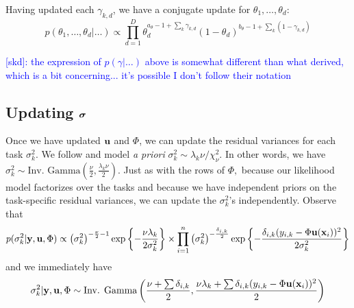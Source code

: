 \documentclass[12pt]{article}
\begin{document}
Having updated each $\gamma_{k,d}$, we have a conjugate update for $\theta_{1},\ldots, \theta_{d}$:
$$
p(\theta_{1}, \ldots, \theta_{d} | \ldots) \propto \prod_{d = 1}^{D}{\theta_{d}^{a_{\theta} - 1 + \sum_{k}{\gamma_{k,d}}}(1 - \theta_{d})^{b_{\theta} - 1 + \sum_{k}{(1 - \gamma_{k,d})}}}
$$


\textcolor{blue}{[skd]: the expression of $p(\gamma | \ldots)$ above is somewhat different than what \citet{Titsias2011} derived, which is a bit concerning... it's possible I don't follow their notation}

\subsection{Updating $\boldsymbol{\sigma}$}
Once we have updated $\mathbf{u}$ and $\Phi$, we can update the residual variances for each task $\sigma^{2}_{k}.$
We follow \citet{Chipman2010} and model \textit{a priori} $\sigma_{k}^{2} \sim \lambda_{k}\nu/\chi^{2}_{\nu}.$
In other words, we have $\sigma^{2}_{k} \sim \text{Inv. Gamma}\left(\frac{\nu}{2}, \frac{\lambda_{k}\nu}{2}\right).$
Just as with the rows of $\Phi,$ because our likelihood model factorizes over the tasks and because we have independent priors on the task-specific residual variances, we can update the $\sigma^{2}_{k}$'s independently.
Observe that
$$
p(\sigma^{2}_{k} | \mathbf{y}, \mathbf{u}, \Phi) \propto \left(\sigma^{2}_{k}\right)^{-\frac{\nu}{2} - 1}\exp\left\{-\frac{\nu\lambda_{k}}{2\sigma^{2}_{k}}\right\} \times \prod_{i = 1}^{n}{\left(\sigma_{k}^{2}\right)^{-\frac{\delta_{i,k}}{2}}\exp\left\{-\frac{\delta_{i,k}(y_{i,k} - \Phi\mathbf{u}(\mathbf{x}_{i}))^{2}}{2\sigma^{2}_{k}}\right\}}
$$
and we immediately have
$$
\sigma^{2}_{k} | \mathbf{y}, \mathbf{u}, \Phi \sim \text{Inv. Gamma}\left(\frac{\nu + \sum{\delta_{i,k}}}{2}, \frac{\nu\lambda_{k} + \sum{\delta_{i,k}(y_{i,k} - \Phi\mathbf{u}(\mathbf{x}_{i}))^{2}}}{2}\right)
$$






\end{document}
